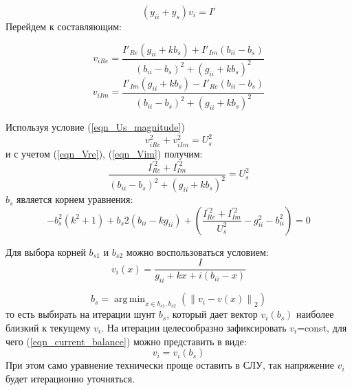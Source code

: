 \documentclass[lettersize,journal]{IEEEtran}
\DeclareMathOperator*{\argmin}{arg\,min} %
\newcommand\norm[1]{\left\lVert#1\right\rVert}
\begin{document}
\begin{equation}
	\label{eqn_implicit_ys}
	(y_{ii} + y_s)v_i = I'
\end{equation}
Перейдем к составляющим:

\begin{equation}
	\label{eqn_Vre}
	v_{iRe} = \frac{I'_{Re}(g_{ii}+kb_s) + I'_{Im}(b_{ii}-b_s)}{(b_{ii}-b_s)^2+(g_{ii}+kb_s)^2}
\end{equation}
\begin{equation}
	\label{eqn_Vim}
	v_{iIm} = \frac{I'_{Im}(g_{ii}+kb_s) - I'_{Re}(b_{ii}-b_s)}{(b_{ii}-b_s)^2+(g_{ii}+kb_s)^2}
\end{equation}

Используя условие (\ref{eqn_Us_magnitude}) 
\begin{equation}
	\label{eqn_Vre_Vim_Abs}
	v_{iRe}^2+v_{iIm}^2 = U_s^2
\end{equation}
и с учетом (\ref{eqn_Vre}), (\ref{eqn_Vim}) получим:
\begin{equation}
	\label{eqn_bs1}
	\frac{I_{Re}^{'2}+I_{Im}^{'2}}{(b_{ii}-b_s)^2+(g_{ii}+kb_s)^2} = U_s^2
\end{equation}
\(b_s\) является корнем уравнения:
\begin{equation}
	\label{eqn_bs2}
	-b_s^2(k^2+1) + b_s2(b_{ii} - kg_{ii}) + \left(\frac{I_{Re}^{'2}+I_{Im}^{'2}}{U_s^2} - g_{ii}^2 - b_{ii}^2\right)=0
\end{equation}

Для выбора корней \(b_{s1}\) и \(b_{s2}\) можно воспользоваться условием:
\begin{equation}
	\label{eqn_vx}
	v_i(x) = \frac{I}{g_{ii} + kx + i(b_{ii} - x)}
\end{equation}

\begin{equation}
	\label{eqn_bs1_bs2_select}
	b_s=\argmin_{x\in{b_{s1}, b_{s2}}}{(\norm{v_i - v(x)}_2)}
\end{equation}
то есть выбирать на итерации шунт \(b_s\), который дает вектор \(v_i(b_s)\) наиболее близкий к текущему \(v_i\).
На итерации целесообразно зафиксировать \(v_i\)=const, для чего (\ref{eqn_current_balance}) можно представить в виде:
\begin{equation}
	\label{eqn_vi_fix}
	v_i=v_i(b_s)
\end{equation}
При этом само уравнение технически проще оставить в СЛУ, так напряжение \(v_i\) будет итерационно уточняться. 
\end{document}
